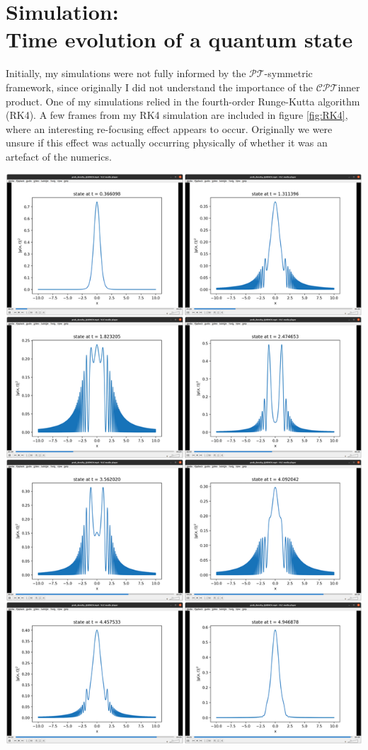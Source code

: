 \documentclass[12pt, a4paper]{report}
\newenvironment{Figure}
    {\par\medskip\noindent\minipage{\linewidth}}
    {\endminipage\par\medskip}
\newcommand\PT{\(\mathcal{PT}\)}
\newcommand\CPT{\(\mathcal{CPT}\)}
\begin{document}
\section{Simulation:\\ Time evolution of a quantum state}
Initially, my simulations were not fully informed by the \PT-symmetric framework, since originally I did not understand the importance of the \CPT\:inner product.
One of my simulations relied in the fourth-order Runge-Kutta algorithm (RK4). A few frames from my RK4 simulation are included in figure \ref{fig:RK4}, where an interesting re-focusing effect appears to occur. Originally we were unsure if this effect was actually occurring physically of whether it was an artefact of the numerics.
\begin{Figure}
\centering
\includegraphics[width=.7\linewidth]{probability_density_in_negquartic.pdf}
\label{fig:RK4}
\end{Figure}
\end{document}
